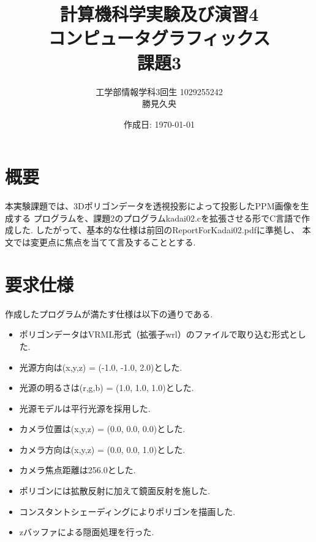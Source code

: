 \documentclass[a4j,dvipdfmx]{jsarticle}
\begin{document}
\title{計算機科学実験及び演習4\\コンピュータグラフィックス\\課題3}
\author{工学部情報学科3回生 1029255242\\勝見久央}
\date{作成日: \today} %
\maketitle
\section{概要}
本実験課題では、3Dポリゴンデータを透視投影によって投影したPPM画像を生成する
プログラムを、課題2のプログラムkadai02.cを拡張させる形でC言語で作成した.
したがって、基本的な仕様は前回のReportForKadai02.pdfに準拠し、
本文では変更点に焦点を当てて言及することとする.

\section{要求仕様}
作成したプログラムが満たす仕様は以下の通りである.
\begin{itemize}
\item ポリゴンデータはVRML形式（拡張子wrl）のファイルで取り込む形式とした.
\item 光源方向は(x,y,z) = (-1.0, -1.0, 2.0)とした.
\item 光源の明るさは(r,g,b) = (1.0, 1.0, 1.0)とした.
\item 光源モデルは平行光源を採用した.
\item カメラ位置は(x,y,z) = (0.0, 0.0, 0.0)とした.
\item カメラ方向は(x,y,z) = (0.0, 0.0, 1.0)とした.
\item カメラ焦点距離は256.0とした.
\item ポリゴンには拡散反射に加えて鏡面反射を施した.
\item コンスタントシェーディングによりポリゴンを描画した.
\item zバッファによる隠面処理を行った.
\end{itemize}
\end{document}
